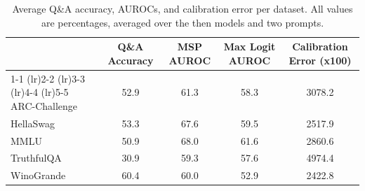 \begin{table}[h]
\caption{Average Q\&A accuracy, AUROCs, and calibration error per dataset. All values are percentages, averaged over the then models and two prompts.}
\label{tab:dataset}
\centering
\begin{tabular}{lcccc}
\toprule
 & Q\&A Accuracy & MSP AUROC & Max Logit AUROC & Calibration Error (x100) \\ 
\cmidrule(lr){1-1} \cmidrule(lr){2-2} \cmidrule(lr){3-3} \cmidrule(lr){4-4} \cmidrule(lr){5-5}
ARC-Challenge & 52.9 & 61.3 & 58.3 & 3078.2\\
HellaSwag & 53.3 & 67.6 & 59.5 & 2517.9\\
MMLU & 50.9 & 68.0 & 61.6 & 2860.6\\
TruthfulQA & 30.9 & 59.3 & 57.6 & 4974.4\\
WinoGrande & 60.4 & 60.0 & 52.9 & 2422.8\\
\bottomrule
\end{tabular}
\end{table}
